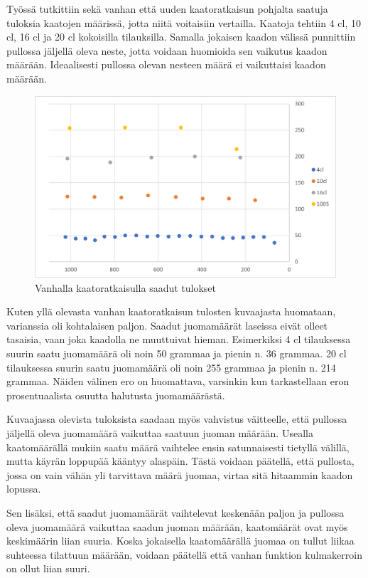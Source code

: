 Työssä tutkittiin sekä vanhan että uuden kaatoratkaisun pohjalta saatuja tuloksia kaatojen määrissä, jotta niitä voitaisiin vertailla. Kaatoja tehtiin 4 cl, 10 cl, 16 cl ja 20 cl kokoisilla tilauksilla. Samalla jokaisen kaadon välissä punnittiin pullossa jäljellä oleva neste, jotta voidaan huomioida sen vaikutus kaadon määrään. Ideaalisesti pullossa olevan nesteen määrä ei vaikuttaisi kaadon määrään.

\begin{figure}[h]
\begin{center}
\includegraphics[scale=0.75]{img/kaadot_vanha_kesken.png}
\end{center}
\caption{Vanhalla kaatoratkaisulla saadut tulokset}
\label{fig:kaadot_vanha}
\end{figure}

Kuten yllä olevasta vanhan kaatoratkaisun tulosten kuvaajasta huomataan, varianssia oli kohtalaisen paljon. Saadut juomamäärät laseissa eivät olleet tasaisia, vaan joka kaadolla ne muuttuivat hieman. Esimerkiksi 4 cl tilauksessa suurin saatu juomamäärä oli noin 50 grammaa ja pienin n. 36 grammaa. 20 cl tilauksessa suurin saatu juomamäärä oli noin 255 grammaa ja pienin n. 214 grammaa. Näiden välinen ero on huomattava, varsinkin kun tarkastellaan eron prosentuaalista osuutta halutusta juomamäärästä.

Kuvaajassa olevista tuloksista saadaan myös vahvistus väitteelle, että pullossa jäljellä oleva juomamäärä vaikuttaa saatuun juoman määrään. Usealla kaatomäärällä mukiin saatu määrä vaihtelee ensin satunnaisesti tietyllä välillä, mutta käyrän loppupää kääntyy alaspäin. Tästä voidaan päätellä, että pullosta, jossa on vain vähän yli tarvittava määrä juomaa, virtaa sitä hitaammin kaadon lopussa.

Sen lisäksi, että saadut juomamäärät vaihtelevat keskenään paljon ja pullossa oleva juomamäärä vaikuttaa saadun juoman määrään, kaatomäärät ovat myös keskimäärin liian suuria. Koska jokaisella kaatomäärällä juomaa on tullut liikaa suhteessa tilattuun määrään, voidaan päätellä että vanhan funktion kulmakerroin on ollut liian suuri.

